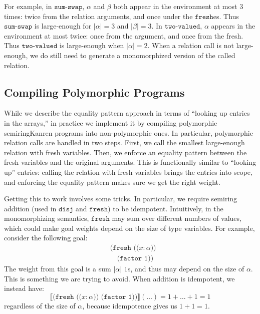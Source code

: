 \documentclass{report}
\theoremstyle{definition}
\newcommand{\den}[1]{\llbracket #1 \rrbracket}
\begin{document}
For example, in \(\texttt{sum-swap}\), \(\alpha\) and \(\beta\) both appear in the environment at most \(3\) times: twice from the relation arguments, and once under the \(\texttt{fresh}\)es.
Thus \(\texttt{sum-swap}\) is large-enough for \(|\alpha| = 3\) and \(|\beta| = 3\).
In \(\texttt{two-valued}\), \(\alpha\) appears in the environment at most twice: once from the argument, and once from the fresh.
Thus \(\texttt{two-valued}\) is large-enough when \(|\alpha| = 2\).
When a relation call is not large-enough, we do still need to generate a monomorphized version of the called relation.

\subsection{Compiling Polymorphic Programs}

While we describe the equality pattern approach in terms of ``looking up entries in the arrays,'' in practice we implement it by compiling polymorphic semiringKanren programs into non-polymorphic ones.
In particular, polymorphic relation calls are handled in two steps.
First, we call the smallest large-enough relation with fresh variables.
Then, we enforce an equality pattern between the fresh variables and the original arguments.
This is functionally similar to ``looking up'' entries: calling the relation with fresh variables brings the entries into scope, and enforcing the equality pattern makes sure we get the right weight.

Getting this to work involves some tricks.
In particular, we require semiring addition (used in \(\texttt{disj}\) and \(\texttt{fresh}\)) to be idempotent.
Intuitively, in the monomorphizing semantics, \(\texttt{fresh}\) may sum over different numbers of values, which could make goal weights depend on the size of type variables.
For example, consider the following goal:
\begin{equation}
\begin{aligned}
	& \texttt{(fresh ((\(x  : \alpha\)))} \\
	& \quad \texttt{(factor 1))}
\end{aligned}
\end{equation}
The weight from this goal is a sum \(|\alpha|\) \(1\)s, and thus may depend on the size of \(\alpha\).
This is something we are trying to avoid.
When addition is idempotent, we instead have:
\begin{equation}
	\den{\texttt{(fresh ((\(x : \alpha\))) (factor 1))}}(\dots) = 1 + \dots + 1 = 1 
\end{equation}
regardless of the size of \(\alpha\), because idempotence gives us \(1 + 1 = 1\).
\end{document}
